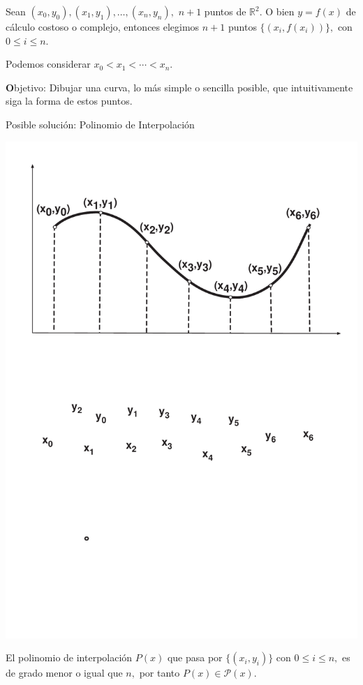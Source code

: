 \documentclass[ebook,oneside]{memoir}
\begin{document}
Sean $(x_0,y_0), (x_1,y_1),\ldots,(x_n,y_n),$ $n+1$ puntos de $\mathbb{R}^2.$  O bien $y=f(x)$ de c\'{a}lculo costoso o complejo, entonces elegimos $n+1$ puntos $\{(x_i,f(x_i))\},$ con $0\leq i\leq n.$

Podemos considerar $x_0<x_1<\cdots <x_n$.

{\textbf Objetivo:} Dibujar una curva, lo m\'{a}s simple o sencilla posible, que intuitivamente siga la forma de  estos puntos.

Posible soluci\'{o}n: Polinomio de Interpolaci\'{o}n

\begin{center}
        \includegraphics[scale=0.55]{polinomioInterpolacion.pdf}
\end{center}

El polinomio de interpolaci\'{o}n $P(x)$ que pasa por $\{(x_i,y_i)\}$ con $0\leq i \leq n,$ es de grado menor o igual que $n,$ por tanto $P(x)\in {\mathcal  P}(x).$
\end{document}
